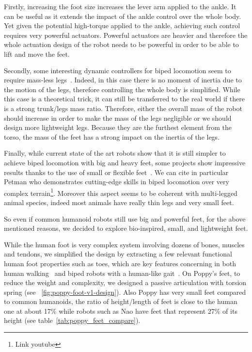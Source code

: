 Firstly, increasing the foot size increases the lever arm applied to the ankle. It can be useful as it extends the impact of the ankle control over the whole body. Yet given the potential high-torque applied to the ankle, achieving such control requires very powerful actuators.
Powerful actuators are heavier and therefore the whole actuation design of the robot needs to be powerful in order to be able to lift and move the feet.

Secondly, some interesting dynamic controllers for biped locomotion seem to require mass-less legs~\parencite{hyon2002development}. Indeed, in this case there is no moment of inertia due to the motion of the legs, therefore controlling the whole body is simplified. While this case is a theoretical trick, it can still be transferred to the real world if there is a strong trunk/legs mass ratio. Therefore, either the overall mass of the robot should increase in order to make the mass of the legs negligible or we should design more lightweight legs.
Because they are the furthest element from the torso, the mass of the feet has a strong impact on the inertia of the legs.

Finally, while current state of the art robots show that it is still simpler to achieve biped locomotion with big and heavy feet, some projects show impressive results thanks to the use of small or flexible feet~\parencite{bruneau2001dynamic}. We can cite in particular Petman who demonstrates cutting-edge skills in biped locomotion over very complex terrain\footnote{Link youtube}.
Moreover this aspect seems to be coherent with multi-legged animal species, indeed most animals have really thin legs and very small feet.

So even if common humanoid robots still use big and powerful feet, for the above mentioned reasons, we decided to explore bio-inspired, small, and lightweight feet.

While the human foot is very complex system involving dozens of bones, muscles and tendons, we simplified the design by extracting a few relevant functional human foot properties such as toes, which are key features concerning in both human walking~\cite{Hughes1990} and biped robots with a human-like gait~\cite{Sellaouti2006}. On Poppy's feet, to reduce the weight and complexity, we designed a passive articulation with torsion spring (see \figurename~\ref{fig:poppy-foot-v1-design}).
Also Poppy has very small feet compared to common humanoids, the ratio of height/length of feet is close to the human one at about 17\% while robots such as Nao have feet that represent 27\% of its height (see table~\ref{tab:poppy_feet_compare}).

